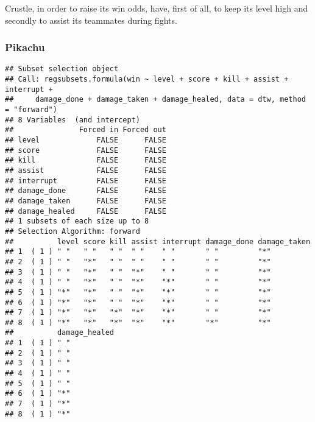 \documentclass[
]{article}
\newenvironment{Shaded}{\begin{snugshade}}{\end{snugshade}}
\newcommand{\AttributeTok}[1]{\textcolor[rgb]{0.77,0.63,0.00}{#1}}
\newcommand{\DecValTok}[1]{\textcolor[rgb]{0.00,0.00,0.81}{#1}}
\newcommand{\FunctionTok}[1]{\textcolor[rgb]{0.00,0.00,0.00}{#1}}
\newcommand{\NormalTok}[1]{#1}
\newcommand{\OtherTok}[1]{\textcolor[rgb]{0.56,0.35,0.01}{#1}}
\newcommand{\SpecialCharTok}[1]{\textcolor[rgb]{0.00,0.00,0.00}{#1}}
\newcommand{\StringTok}[1]{\textcolor[rgb]{0.31,0.60,0.02}{#1}}
\begin{document}
Crustle, in order to raise its win odds, have, first of all, to keep its
level high and secondly to assist its teammates during fights.

\hypertarget{pikachu}{%
\subsubsection{Pikachu}\label{pikachu}}

\begin{Shaded}
\end{Shaded}

\begin{verbatim}
## Subset selection object
## Call: regsubsets.formula(win ~ level + score + kill + assist + interrupt + 
##     damage_done + damage_taken + damage_healed, data = dtw, method = "forward")
## 8 Variables  (and intercept)
##               Forced in Forced out
## level             FALSE      FALSE
## score             FALSE      FALSE
## kill              FALSE      FALSE
## assist            FALSE      FALSE
## interrupt         FALSE      FALSE
## damage_done       FALSE      FALSE
## damage_taken      FALSE      FALSE
## damage_healed     FALSE      FALSE
## 1 subsets of each size up to 8
## Selection Algorithm: forward
##          level score kill assist interrupt damage_done damage_taken
## 1  ( 1 ) " "   " "   " "  " "    " "       " "         "*"         
## 2  ( 1 ) " "   "*"   " "  " "    " "       " "         "*"         
## 3  ( 1 ) " "   "*"   " "  "*"    " "       " "         "*"         
## 4  ( 1 ) " "   "*"   " "  "*"    "*"       " "         "*"         
## 5  ( 1 ) "*"   "*"   " "  "*"    "*"       " "         "*"         
## 6  ( 1 ) "*"   "*"   " "  "*"    "*"       " "         "*"         
## 7  ( 1 ) "*"   "*"   "*"  "*"    "*"       " "         "*"         
## 8  ( 1 ) "*"   "*"   "*"  "*"    "*"       "*"         "*"         
##          damage_healed
## 1  ( 1 ) " "          
## 2  ( 1 ) " "          
## 3  ( 1 ) " "          
## 4  ( 1 ) " "          
## 5  ( 1 ) " "          
## 6  ( 1 ) "*"          
## 7  ( 1 ) "*"          
## 8  ( 1 ) "*"
\end{verbatim}
\end{document}
